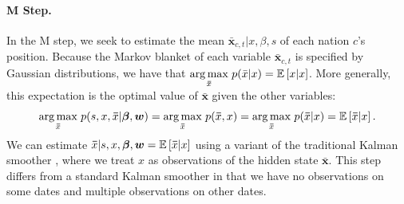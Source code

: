 

\paragraph{M Step.} In the M step, we seek to estimate the mean $\bm
\bar x_{c,t} | x, \beta, s$ of each nation $c$'s position.  Because
the Markov blanket of each variable $\bm \bar x_{c,t}$ is specified by
Gaussian distributions, we have that $\underset{\bm \bar x} { \arg
  \max }\hspace{3pt} p( \bar x | x ) = \mathbb{E}\left[x | x\right]$.  More
generally, this expectation is the optimal value of $\bm \bar x$ given
the other variables:
\begin{align}
  \underset{\bm \bar x} { \arg \max }\hspace{3pt} p(s, x, \bm \bar x |
  \bm \beta, \bm w)
  = \underset{\bm \bar x} { \arg \max }\hspace{3pt} p(\bm \bar x,  x )
  = \underset{\bm \bar x} { \arg \max }\hspace{3pt} p(\bm \bar x | x )
  = \mathbb{E}\left[\bm \bar x | x\right].
\end{align}
We can estimate $\bm \bar x | s, x, \bm \beta, \bm w = \mathbb{E}\left[\bm \bar x | x\right]$
using a variant of the traditional Kalman smoother
\citep{kalman:1960}, where we treat $x$ as observations of the hidden
state $\bm \bar x$.  This step differs from a standard Kalman smoother
in that we have no observations on some dates and multiple
observations on other dates.

